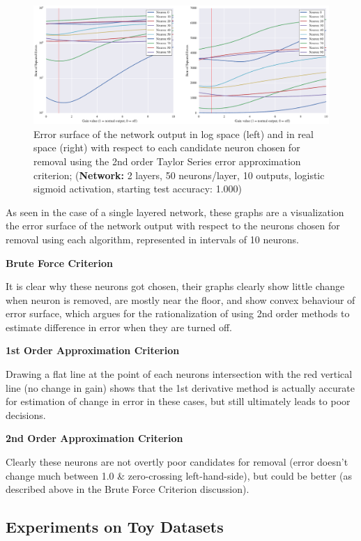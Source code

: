 \begin{figure}[!hb]
\centering
\includegraphics[width=\linewidth]{png/mnist-deep-g2-gain.pdf}
\caption{Error surface of the network output in log space (left) and in real space (right) with respect to each candidate neuron chosen for removal using the 2nd order Taylor Series error approximation criterion; (\textbf{Network:} 2 layers, 50 neurons/layer, 10 outputs, logistic sigmoid activation, starting test accuracy: 1.000)}
\label{fig:mnist-g2-double-layer}
\end{figure}


As seen in the case of a single layered network, these graphs are a visualization the error surface of the network output with respect to the neurons chosen for removal using each algorithm, represented in intervals of 10 neurons. 

\textbf{Brute Force Criterion}

It is clear why these neurons got chosen, their graphs clearly show little change when neuron is removed, are mostly near the floor, and show convex behaviour of error surface, which argues for the rationalization of using 2nd order methods to estimate difference in error when they are turned off.

\textbf{1st Order Approximation Criterion}

Drawing a flat line at the point of each neurons intersection with the red vertical line (no change in gain) shows that the 1st derivative method is actually accurate for estimation of change in error in these cases, but still ultimately leads to poor decisions. 

\textbf{2nd Order Approximation Criterion}

Clearly these neurons are not overtly poor candidates for removal (error doesn't change much between 1.0 \& zero-crossing left-hand-side), but could be better (as described above in the Brute Force Criterion discussion).


\subsection{Experiments on Toy Datasets}

